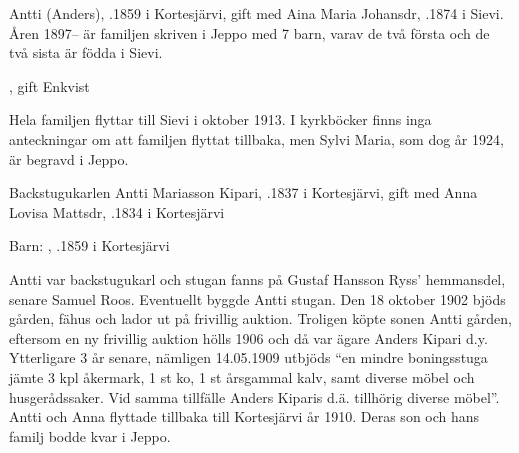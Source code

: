 %
Antti (Anders), .1859 i Kortesjärvi, gift med Aina Maria Johansdr, .1874 i Sievi. Åren 1897-- är familjen skriven i Jeppo med 7 barn, varav de två första och de två sista är födda i Sievi.
\begin{jhchildren}
  \item {}
  \item {}, gift Enkvist
  \item {}
  \item {}
  \item {}
  \item {}
  \item {}
\end{jhchildren}
Hela familjen flyttar till Sievi i oktober 1913. I kyrkböcker finns inga anteckningar om att familjen flyttat tillbaka, men Sylvi Maria, som dog år 1924, är begravd i Jeppo.


%
Backstugukarlen Antti Mariasson Kipari, .1837 i Kortesjärvi, gift med Anna Lovisa Mattsdr, .1834 i Kortesjärvi

Barn: , .1859 i Kortesjärvi

Antti var backstugukarl och stugan fanns på Gustaf Hansson Ryss' hemmansdel, senare Samuel Roos. Eventuellt byggde Antti stugan. Den 18 oktober 1902 bjöds gården, fähus och lador ut på frivillig auktion. Troligen köpte sonen Antti gården, eftersom en ny frivillig auktion hölls 1906 och då var ägare Anders Kipari d.y. Ytterligare 3 år senare, nämligen 14.05.1909 utbjöds ``en mindre boningsstuga jämte 3 kpl åkermark, 1 st ko, 1 st årsgammal kalv, samt diverse möbel och husgerådssaker. Vid samma tillfälle Anders Kiparis d.ä. tillhörig diverse möbel''. Antti och Anna flyttade tillbaka till Kortesjärvi år 1910. Deras son och hans familj bodde kvar i Jeppo.



